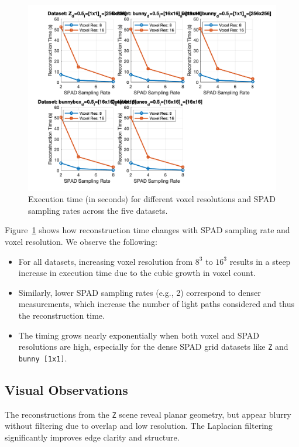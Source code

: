 \documentclass[a4paper,10pt]{article}
\begin{document}
\begin{figure}[h!]
    \centering
    \includegraphics[width=0.95\linewidth]{performance_chart.png}
    \caption{Execution time (in seconds) for different voxel resolutions and SPAD sampling rates across the five datasets.}
    \label{fig:timing}
\end{figure}

Figure~\ref{fig:timing} shows how reconstruction time changes with SPAD sampling rate and voxel resolution. We observe the following:

\begin{itemize}
    \item For all datasets, increasing voxel resolution from $8^3$ to $16^3$ results in a steep increase in execution time due to the cubic growth in voxel count.
    \item Similarly, lower SPAD sampling rates (e.g., 2) correspond to denser measurements, which increase the number of light paths considered and thus the reconstruction time.
    \item The timing grows nearly exponentially when both voxel and SPAD resolutions are high, especially for the dense SPAD grid datasets like \texttt{Z} and \texttt{bunny [1x1]}.
\end{itemize}

\subsection*{Visual Observations}

The reconstructions from the \texttt{Z} scene reveal planar geometry, but appear blurry without filtering due to overlap and low resolution. The Laplacian filtering significantly improves edge clarity and structure.
\end{document}
